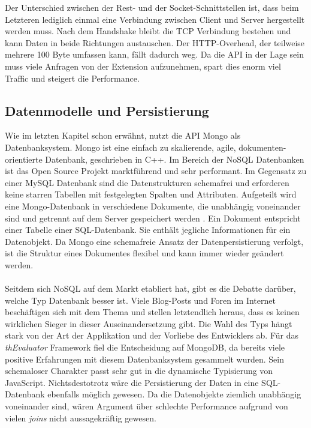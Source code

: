 Der Unterschied zwischen der Rest- und der Socket-Schnittstellen ist, dass beim Letzteren lediglich einmal eine Verbindung zwischen Client und Server hergestellt werden muss. Nach dem Handshake bleibt die TCP Verbindung bestehen und kann Daten in beide Richtungen austauschen. Der HTTP-Overhead, der teilweise mehrere 100 Byte umfassen kann, fällt dadurch weg. Da die API in der Lage sein muss viele Anfragen von der Extension aufzunehmen, spart dies enorm viel Traffic und steigert die Performance.

\subsection{Datenmodelle und Persistierung}
\label{mongo}

Wie im letzten Kapitel schon erwähnt, nutzt die API Mongo als Datenbanksystem. Mongo ist eine einfach zu skalierende, agile, dokumenten-orientierte Datenbank, geschrieben in C++. Im Bereich der NoSQL Datenbanken ist das Open Source Projekt marktführend und sehr performant. Im Gegensatz zu einer MySQL Datenbank sind die Datenstrukturen schemafrei und erforderen keine starren Tabellen mit festgelegten Spalten und Attributen. Aufgeteilt wird eine Mongo-Datenbank in verschiedene Dokumente, die unabhängig voneinander sind und getrennt auf dem Server gespeichert werden \cite{nosql}. Ein Dokument entspricht einer Tabelle einer SQL-Datenbank. Sie enthält jegliche Informationen für ein Datenobjekt. Da Mongo eine schemafreie Ansatz der Datenpersistierung verfolgt, ist die Struktur eines Dokumentes flexibel und kann immer wieder geändert werden.\\
\\
Seitdem sich NoSQL auf dem Markt etabliert hat, gibt es die Debatte darüber, welche Typ Datenbank besser ist. Viele Blog-Posts und Foren im Internet beschäftigen sich mit dem Thema und stellen letztendlich heraus, dass es keinen wirklichen Sieger in dieser Auseinandersetzung gibt. Die Wahl des Typs hängt stark von der Art der Applikation und der Vorliebe des Entwicklers ab. Für das \textit{thEvaluator} Framework fiel die Entscheidung auf MongoDB, da bereits viele positive Erfahrungen mit diesem Datenbanksystem gesammelt wurden. Sein schemaloser Charakter passt sehr gut in die dynamische Typisierung von JavaScript. Nichtsdestotrotz wäre die Persistierung der Daten in eine SQL-Datenbank ebenfalls möglich gewesen. Da die Datenobjekte ziemlich unabhängig voneinander sind, wären Argument über schlechte Performance aufgrund von vielen \textit{joins} nicht aussagekräftig gewesen.\\
